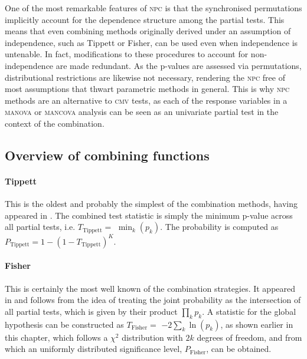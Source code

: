 One of the most remarkable features of \textsc{npc} is that the synchronised permutations implicitly account for the dependence structure among the partial tests. This means that even combining methods originally derived under an assumption of independence, such as Tippett or Fisher, can be used even when independence is untenable. In fact, modifications to these procedures to account for non-independence \citep[e.g.,][for the Fisher method]{Brown1975, Kost2002} are made redundant. As the p-values are assessed via permutations, distributional restrictions are likewise not necessary, rendering the \textsc{npc} free of most assumptions that thwart parametric methods in general. This is why \textsc{npc} methods are an alternative to \textsc{cmv} tests, as each of the response variables in a \textsc{manova} or \textsc{mancova} analysis can be seen as an univariate partial test in the context of the combination.

\subsection{Overview of combining functions}

\paragraph{Tippett} This is the oldest and probably the simplest of the combination methods, having appeared in \citet{Tippett1931}. The combined test statistic is simply the minimum p-value across all partial tests, i.e. $T_{\text{Tippett}} =$ $\min_{k} \left(p_{k}\right)$. The probability is computed as $P_{\text{Tippett}} = 1-\left(1-T_{\text{Tippett}}\right)^{K}$.

\paragraph{Fisher} This is certainly the most well known of the combination strategies. It appeared in \citet{Fisher1932} and follows from the idea of treating the joint probability as the intersection of all partial tests, which is given by their product $\prod_{k} p_{k}$. A statistic for the global hypothesis can be constructed as $T_{\text{Fisher}} =$ $-2 \sum_{k} \ln\left(p_{k}\right)$, as shown earlier in this chapter, which follows a $\chi^2$ distribution with $2k$ degrees of freedom, and from which an uniformly distributed significance level, $P_{\text{Fisher}}$, can be obtained.

